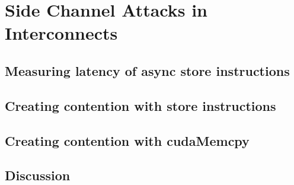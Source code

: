 \chapter{Side Channel Attacks in Interconnects}

\section{Measuring latency of async store instructions}\label{sec:async-stores}
\section{Creating contention with store instructions}\label{sec:contention-with-stores}
\section{Creating contention with cudaMemcpy}\label{sec:contention-with-cudamemcpy}
\section{Discussion}\label{sec:interconnect-sc-discussion}

\endinput

Should we consider the pre-microcode-update results and talk about that? It is NOT a vulnerability, just a behavioural observation. Hence, I don't think we need responsible disclosure